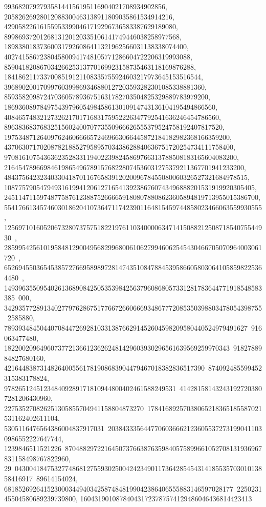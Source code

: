 {{{   993682079279358144156195116904021708934902856, 
   20582626928012088300463138911809035861534914216, 
   429058226161559533990461719296736583387629189080, 
   8998693720126813120120335106141749446038258977568, 
   189838018373600317926086411321962566031138338074400, 
   4027415867238045800941748105771286604722206319993088, 
   85904182086703426625313770169923158735463118169876288, 
   1841862117337008519121108335755924603217973645153516544, 
   39689020017099760399869346880127203593282301085338881360, 
   859358209872470360578936751631782703504825329889783979200, 
   18693608978497543979605498458613010914743136104195494866560, 
   408465748321273262170171683175952226347792541636246454786560, 
   8963836837683251560240070773550966626555379524758192407817520, 
   197534871264097624606666572469663066445872184182982368166359200, 
   4370630717020878218852795895703438628840636751720254734111758400, 
   97081610754363623528331194022398245869766313788508183165604083200, 
   2164547896698461986549678915768228074536031275379211367701941233200, 
   48437564232340330418701167658391202009678455080060326527321684978515, 
   1087757905479493161994120612716541392386760743496888201531919920305405, 
   24511471159748775876123887526666591808078808623605894819713955015386700, 
   554176613457460301862041073647117423901164815459744858023466063559930555, 
   12569710160520673280737575182219761103400006347141508821250871854075544930\
, 
   285995425610195848129004956829968006106279946062545430466705070964003061720\
, 
   6526945503654538572766958989728147435108478845395866058030641058598225364480\
, 149396355095402613689084250535398425637960868057331281783644771918548583385\
000, 342935772891340277976286751776672660666934867772085350398803478054398755\
2585880, 78939348450440708447269281033138766291452604598209580440524979491627\
916063477480, 182200209649607377213661236262481429603930296561639569259970343\
9182788984827680160, 42164483873148264005561781908683904479467018382836517390\
874092485599452315383178824, 978265124512348409289171810944800402461588249531\
414281581432431927203807281206430960, 227535270826251305855704941158804873270\
17841689257038065218365185587021531162402611104, 5305116476564386004837917031\
20384333564477060366621236055372731990411030986552227647744, 1239846511521226\
8704882972216450737663876359840575899661052708131936967831158498767822960, 29\
04300418475327748681275593025004242349011736428545431418553570301013858416917\
89614154024, 6818526926415230003449403425874848199042386406555883146597028177\
225023145504580689239739800, 160431901087840431723787574129486046436814423413\
}}}
